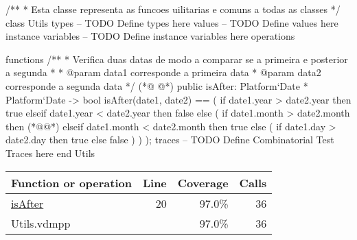 \begin{vdmpp}[breaklines=true]
/**
* Esta classe representa as funcoes uilitarias e comuns a todas as classes
*/
class Utils
types
-- TODO Define types here
values
-- TODO Define values here
instance variables
-- TODO Define instance variables here
operations
 
functions
 /**
 * Verifica duas datas de modo a comparar se a primeira e posterior a segunda
 * 
 * @param data1 corresponde a primeira data
 * @param data2 corresponde a segunda data
 */
(*@
\label{isAfter:20}
@*)
 public isAfter: Platform`Date * Platform`Date -> bool
  isAfter(date1, date2) ==
  (
   if date1.year > date2.year then
    true
   elseif date1.year < date2.year then 
    false
   else 
   (
    if date1.month > date2.month then
     (*@@*)
    elseif date1.month < date2.month then
     true
    else 
    (
     if date1.day > date2.day then
      true
     else 
      false
    )
   )
  );
traces
-- TODO Define Combinatorial Test Traces here
end Utils
\end{vdmpp}
\bigskip
\begin{longtable}{|l|r|r|r|}
\hline
Function or operation & Line & Coverage & Calls \\
\hline
\hline
\hyperref[isAfter:20]{isAfter} & 20&97.0\% & 36 \\
\hline
\hline
Utils.vdmpp & & 97.0\% & 36 \\
\hline
\end{longtable}

